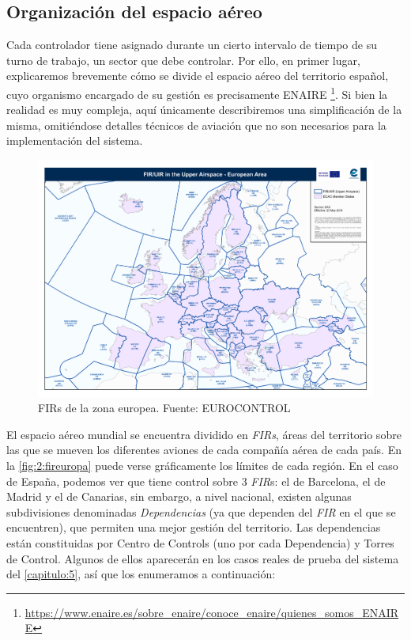 \subsection{Organización del espacio aéreo}
\label{section:2:sectores-y-sectorizacion}
Cada controlador tiene asignado durante un cierto intervalo de tiempo de su turno de trabajo, un sector que debe controlar.
Por ello, en primer lugar, explicaremos brevemente cómo se divide el espacio aéreo del territorio español, cuyo organismo encargado de su gestión es precisamente ENAIRE%
\footnote{\url{https://www.enaire.es/sobre_enaire/conoce_enaire/quienes_somos_ENAIRE}}.
Si bien la realidad es muy compleja, aquí únicamente describiremos una simplificación de la misma, omitiéndose
detalles técnicos de aviación que no son necesarios para la implementación del sistema.

\begin{figure}
	\centering
	\includegraphics[width=\linewidth]{FIR_europa}
	\caption[FIRs de la zona europea]{FIRs de la zona europea. Fuente: EUROCONTROL}
	\label{fig:2:fireuropa}
\end{figure}

El espacio aéreo mundial se encuentra dividido en \textit{\glspl{FIR}}, áreas del territorio sobre las que se mueven los diferentes aviones de cada compañía aérea de cada país. En la \autoref{fig:2:fireuropa} puede verse gráficamente los límites de cada región.
En el caso de España, podemos ver que tiene control sobre 3 \textit{FIR}s: el de Barcelona, el de Madrid y el de Canarias, sin embargo, a nivel nacional, existen algunas subdivisiones denominadas \textit{Dependencias} (ya que dependen del \textit{FIR} en el que se encuentren), que permiten una mejor gestión del territorio. Las dependencias están constituidas por \glspl{Centro de Control} (uno por cada Dependencia) y Torres de Control. Algunos de ellos aparecerán en los casos reales de prueba del sistema del \autoref{capitulo:5}, así que los enumeramos a continuación:

